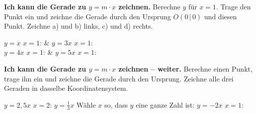 \setcounter{aufgabe}{0}
\hypertarget{e1}{}

\begin{aufgabe}{\textbf{Ich kann die Gerade zu $y = m \cdot x$ zeichnen.} Berechne $y$ für $x = 1$. Trage den Punkt ein und zeichne die Gerade durch den Ursprung $O(0\,|\,0)$ und diesen Punkt. Zeichne a) und b) links, c) und d) rechts.}
\begin{teilezwei}
\tz $y = x$ \quad $x = 1$:  & \tz $y = 3x$ \quad $x = 1$:  \\
\tz $y = 4x$ \quad $x = 1$:  & \tz $y = 5x$ \quad $x = 1$:  \\
\end{teilezwei}

\begin{ksys}[xmin=-1,xmax=3,ymin=-1,ymax=6]
\end{ksys}\ksysabstand\begin{ksys}[xmin=-1,xmax=3,ymin=-1,ymax=6]
\end{ksys}

\end{aufgabe}

\begin{aufgabe}{\textbf{Ich kann die Gerade zu $y = m \cdot x$ zeichnen – weiter.} Berechne einen Punkt, trage ihn ein und zeichne die Gerade durch den Ursprung. Zeichne alle drei Geraden in dasselbe Koordinatensystem.}
\setcounter{teil}{4}
\begin{teile}
\teil $y = 2{,}5x$ \quad $x = 2$: 
\teil $y = \frac{1}{3}x$ \quad Wähle $x$ so, dass $y$ eine ganze Zahl ist: \quad {} 
\teil $y = -2x$ \quad $x = 1$: 
\end{teile}

\begin{ksys}[xmin=-2,xmax=4,ymin=-4,ymax=6]
\end{ksys}

\end{aufgabe}

